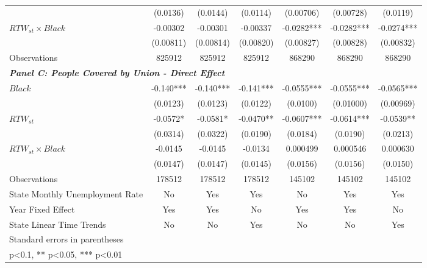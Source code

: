 \begin{table}[ht!]
\begin{tabular}{l*{6}{c}}
&    (0.0136)   &    (0.0144)   &    (0.0114)   &   (0.00706)   &   (0.00728)   &    (0.0119)   \\
[1em]
$ RTW_{st} \times Black $&    -0.00302   &    -0.00301   &    -0.00337   &     -0.0282***&     -0.0282***&     -0.0274***\\
&   (0.00811)   &   (0.00814)   &   (0.00820)   &   (0.00827)   &   (0.00828)   &   (0.00832)   \\
\hline
Observations        &      825912   &      825912   &      825912   &      868290   &      868290   &      868290   \\
\hline
\multicolumn{3}{l}{\linebreak \textbf{\textit{Panel C: People Covered by Union - Direct Effect}}} \\
$ Black $           &      -0.140***&      -0.140***&      -0.141***&     -0.0555***&     -0.0555***&     -0.0565***\\
&    (0.0123)   &    (0.0123)   &    (0.0122)   &    (0.0100)   &   (0.01000)   &   (0.00969)   \\
[1em]
$ RTW_{st} $      &     -0.0572*  &     -0.0581*  &     -0.0470** &     -0.0607***&     -0.0614***&     -0.0539** \\
&    (0.0314)   &    (0.0322)   &    (0.0190)   &    (0.0184)   &    (0.0190)   &    (0.0213)   \\
[1em]
$ RTW_{st} \times Black $&     -0.0145   &     -0.0145   &     -0.0134   &    0.000499   &    0.000546   &    0.000630   \\
&    (0.0147)   &    (0.0147)   &    (0.0145)   &    (0.0156)   &    (0.0156)   &    (0.0150)   \\
\hline
Observations        &      178512   &      178512   &      178512   &      145102   &      145102   &      145102   \\
\hline
State Monthly Unemployment Rate&          No   &         Yes   &         Yes   &          No   &         Yes   &         Yes   \\
Year Fixed Effect   &         Yes   &         Yes   &          No   &         Yes   &         Yes   &          No   \\
State Linear Time Trends&          No   &          No   &         Yes   &          No   &          No   &         Yes   \\
\hline\hline
\multicolumn{7}{l}{\footnotesize Standard errors in parentheses}\\
\multicolumn{7}{l}{\footnotesize * p<0.1, ** p<0.05, *** p<0.01}\\
\end{tabular}
\end{table}
